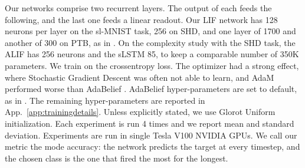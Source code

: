 Our networks comprise two recurrent layers. The output of each feeds the following, and the last one feeds a linear readout. Our LIF network has 128 neurons per layer on the sl-MNIST task, 256 on SHD, and one layer of 1700 and another of 300 on PTB, as in \cite{wozniak2020deep}. On the complexity study with the SHD task, the ALIF has 256 neurons and the sLSTM 85, to keep a comparable number of 350K parameters. We train on the crossentropy loss.  The optimizer had a strong effect, where Stochastic Gradient Descent \cite{robbins1951stochastic, kiefer1952stochastic} was often not able to learn, and AdaM \cite{adam} performed worse than AdaBelief \cite{zhuang2020adabelief}. AdaBelief hyper-parameters are set to default, as in \cite{radford2018improving, zenke2021remarkable}. The remaining hyper-parameters are reported in App.~\ref{app:trainingdetails}. Unless explicitly stated, we use Glorot Uniform initialization. Each experiment is run 4 times and we report mean and standard deviation. Experiments are run in single Tesla V100 NVIDIA GPUs. We call our metric the mode accuracy: the network predicts the target at every timestep, and the chosen class is  the one that fired the most for the longest.







